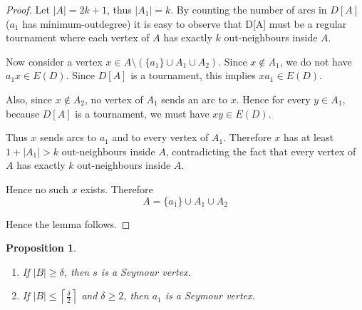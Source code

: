\documentclass[a4paper,fleqn]{cas-sc}
\newtheorem{proposition}[theorem]{Proposition}
\theoremstyle{definition}
\begin{document}
\begin{proof}
Let $|A|=2k+1$, thus \(|A_{1}|=k\). By counting the number of arcs in \(D[A]\) ($a_1$ has minimum-outdegree) it is easy to observe that D[A] must be a regular tournament where each vertex of $A$ has exactly \(k\) out-neighbours inside \(A\).

Now consider a vertex $x\in A\setminus(\{a_{1}\}\cup A_{1}\cup A_{2}).$
Since \(x\notin A_{1}\), we do not have \(a_{1}x\in E(D)\). Since \(D[A]\) is a tournament, this implies $xa_{1}\in E(D).$

Also, since \(x\notin A_{2}\), no vertex of \(A_{1}\) sends an arc to \(x\). Hence for every \(y\in A_{1}\), because \(D[A]\) is a tournament, we must have $xy\in E(D).$

Thus \(x\) sends arcs to \(a_{1}\) and to every vertex of \(A_{1}\). Therefore \(x\) has at least $1+|A_{1}|>k$ out-neighbours inside \(A\), contradicting the fact that every vertex of \(A\) has exactly \(k\) out-neighbours inside \(A\).

Hence no such \(x\) exists. Therefore 
\[
A=\{a_{1}\}\cup A_{1}\cup A_{2}
\]

Hence the lemma follows.

\end{proof}

\begin{proposition}~\label{app: prop:easyseymour}

\begin{enumerate}
    \item If $|B|\geq \delta$, then $s$ is a Seymour vertex.

\item If $|B|\leq \left\lceil \frac{\delta}{2}\right\rceil$
and \(\delta\geq 2\), then $a_1$ is a Seymour vertex.
\end{enumerate}
\end{proposition}
\end{document}
